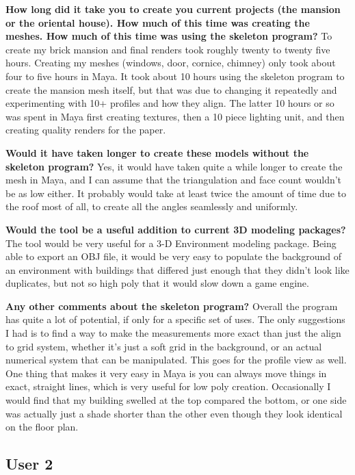 {\bf How long did it take you to create you current projects (the mansion or the oriental house). How much of this time was creating the meshes. How much of this time was using the skeleton program?}
	To create my brick mansion and final renders took roughly twenty to twenty five hours.  Creating my meshes (windows, door, cornice, chimney) only took about four to five hours in Maya.  It took about 10 hours using the skeleton program to create the mansion mesh itself, but that was due to changing it repeatedly and experimenting with 10+ profiles and how they align.  The latter 10 hours or so was spent in Maya first creating textures, then a 10 piece lighting unit, and then creating quality renders for the paper.

{\bf Would it have taken longer to create these models without the skeleton program? }
Yes, it would have taken quite a while longer to create the mesh in Maya, and I can assume that the triangulation and face count wouldn't be as low either.  It probably would take at least twice the amount of time due to the roof most of all, to create all the angles seamlessly and uniformly.

{\bf Would the tool be a useful addition to current 3D modeling packages?}
	The tool would be very useful for a 3-D Environment modeling package.  Being able to export an OBJ file, it would be very easy to populate the background of an environment with buildings that differed just enough that they didn't look like duplicates, but not so high poly that it would slow down a game engine.

{\bf Any other comments about the skeleton program?}
	Overall the program has quite a lot of potential, if only for a specific set of uses.  The only suggestions I had is to find a way to make the measurements more exact than just the align to grid system, whether it's just a soft grid in the background, or an actual numerical system that can be manipulated.  This goes for the profile view as well.  One thing that makes it very easy in Maya is you can always move things in exact, straight lines, which is very useful for low poly creation.  Occasionally I would find that my building swelled at the top compared the bottom, or one side was actually just a shade shorter than the other even though they look identical on the floor plan.

\subsection{User 2}


